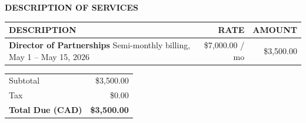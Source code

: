 \documentclass[11pt,a4paper]{article}
\renewcommand{\arraystretch}{1.25}
\newcommand{\eyebrowsimple}[1]{%
  \textcolor{faint}{\fontsize{8}{10}\selectfont\textbf{\MakeUppercase{#1}}}%
}
\begin{document}
\vspace{0.7cm}

\eyebrowsimple{Description of Services}
\vspace{6pt}

\renewcommand{\arraystretch}{1.5}
\begin{tabularx}{\textwidth}{@{} >{\RaggedRight}X r r @{}}
\hline
\rowcolor{soft}
{\fontsize{8}{10}\selectfont\textbf{\textcolor{muted}{\MakeUppercase{Description}}}} &
{\fontsize{8}{10}\selectfont\textbf{\textcolor{muted}{\MakeUppercase{Rate}}}} &
{\fontsize{8}{10}\selectfont\textbf{\textcolor{muted}{\MakeUppercase{Amount}}}} \\
\hline
\textcolor{ink}{\textbf{Director of Partnerships}}\newline
\textcolor{muted}{\footnotesize Semi-monthly billing, May 1 -- May 15, 2026}
& \textcolor{body}{\$7,000.00 / mo}
& \textcolor{ink}{\$3,500.00} \\
\hline
\end{tabularx}

\vspace{0.3cm}

\hfill
\begin{minipage}{0.45\textwidth}
\renewcommand{\arraystretch}{1.35}
\begin{tabularx}{\textwidth}{@{} X r @{}}
\textcolor{muted}{Subtotal} & \textcolor{body}{\$3,500.00} \\
\textcolor{muted}{Tax} & \textcolor{body}{\$0.00} \\
\hline
\rowcolor{soft}
\textcolor{ink}{\textbf{Total Due (CAD)}} &
{\fontsize{16}{18}\selectfont\textcolor{ink}{\textbf{\$3,500.00}}} \\
\hline
\end{tabularx}
\end{minipage}

\vspace{0.85cm}

\end{document}
